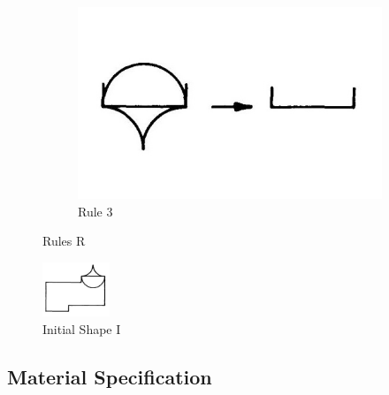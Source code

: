 \documentclass[11pt, a4paper]{report}
\begin{document}
\begin{figure}
    \begin{subfigure}[b]{0.3\textwidth}
        \includegraphics[width=\textwidth]{sg_specification_rule3.jpg}
        \caption{Rule 3}
        \label{fig:Shape Grammars/Shape Specification/Rule 3}
    \end{subfigure}
    \caption{ Rules R \citep{shapeGrammars:1972}}\label{fig:Shape Grammars/Shape Specification/Rules_R}
\end{figure}
\begin{figure}
    \centering
    \includegraphics[width=2cm]{sg_specification_I.jpg}
    \caption{ Initial Shape I \citep{shapeGrammars:1972}}\label{fig:Shape Grammars/Shape Specification/Rules_I}
\end{figure}

\subsection{Material Specification\citep{shapeGrammars:1972}}
\end{document}
